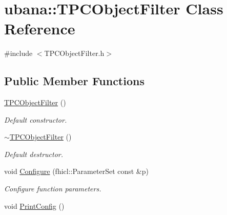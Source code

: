 \hypertarget{classubana_1_1TPCObjectFilter}{\section{ubana\-:\-:T\-P\-C\-Object\-Filter Class Reference}
\label{classubana_1_1TPCObjectFilter}
}


{\ttfamily \#include $<$T\-P\-C\-Object\-Filter.\-h$>$}

\subsection*{Public Member Functions}
\begin{DoxyCompactItemize}
\item 
\hypertarget{classubana_1_1TPCObjectFilter_aa898a1ea96ce8bf1bf164111157a497d}{\hyperlink{classubana_1_1TPCObjectFilter_aa898a1ea96ce8bf1bf164111157a497d}{T\-P\-C\-Object\-Filter} ()}\label{classubana_1_1TPCObjectFilter_aa898a1ea96ce8bf1bf164111157a497d}

\begin{DoxyCompactList}\small\item\em Default constructor. \end{DoxyCompactList}\item 
\hypertarget{classubana_1_1TPCObjectFilter_ad8a3f726f247b5651272397ee344ef1e}{\hyperlink{classubana_1_1TPCObjectFilter_ad8a3f726f247b5651272397ee344ef1e}{$\sim$\-T\-P\-C\-Object\-Filter} ()}\label{classubana_1_1TPCObjectFilter_ad8a3f726f247b5651272397ee344ef1e}

\begin{DoxyCompactList}\small\item\em Default destructor. \end{DoxyCompactList}\item 
\hypertarget{classubana_1_1TPCObjectFilter_a49a5f29b105c442cc8fe97d05066c72a}{void \hyperlink{classubana_1_1TPCObjectFilter_a49a5f29b105c442cc8fe97d05066c72a}{Configure} (fhicl\-::\-Parameter\-Set const \&p)}\label{classubana_1_1TPCObjectFilter_a49a5f29b105c442cc8fe97d05066c72a}

\begin{DoxyCompactList}\small\item\em Configure function parameters. \end{DoxyCompactList}\item 
\hypertarget{classubana_1_1TPCObjectFilter_a542681a3872f6662e58e83330dddfe8c}{void \hyperlink{classubana_1_1TPCObjectFilter_a542681a3872f6662e58e83330dddfe8c}{Print\-Config} ()}\label{classubana_1_1TPCObjectFilter_a542681a3872f6662e58e83330dddfe8c}


\end{DoxyCompactItemize}
